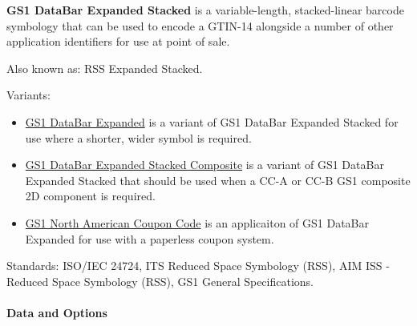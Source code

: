 \textbf{GS1 DataBar Expanded Stacked} is a variable-length,
stacked-linear barcode symbology that can be used to encode a GTIN-14
alongside a number of other application identifiers for use at point of
sale.

Also known as: RSS Expanded Stacked.

Variants:

\begin{itemize}
\tightlist
\item
  \protect\hyperlink{gs1-databar-expanded}{GS1 DataBar Expanded} is a
  variant of GS1 DataBar Expanded Stacked for use where a shorter, wider
  symbol is required.
\item
  \protect\hyperlink{gs1-composite-symbols}{GS1 DataBar Expanded Stacked
  Composite} is a variant of GS1 DataBar Expanded Stacked that should be
  used when a CC-A or CC-B GS1 composite 2D component is required.
\item
  \protect\hyperlink{gs1-north-american-coupon-code}{GS1 North American
  Coupon Code} is an applicaiton of GS1 DataBar Expanded for use with a
  paperless coupon system.
\end{itemize}

Standards: ISO/IEC 24724, ITS Reduced Space Symbology (RSS), AIM ISS -
Reduced Space Symbology (RSS), GS1 General Specifications.

\hypertarget{data-and-options-37}{%
\paragraph{Data and Options}\label{data-and-options-37}}

